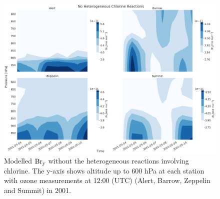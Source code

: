 \begin{figure}
    \centering
    \includegraphics[width = \linewidth]{Chapter6_Results/images/noCl_2001_bry.png}
    \caption{Modelled $\mathrm{Br_y}$ without the heterogeneous reactions involving chlorine. The y-axis shows altitude up to 600 hPa at each station with ozone measurements at 12:00 (UTC) (Alert, Barrow, Zeppelin and Summit) in 2001.}
    \label{fig:vert_noCl_bry_2001}
\end{figure}